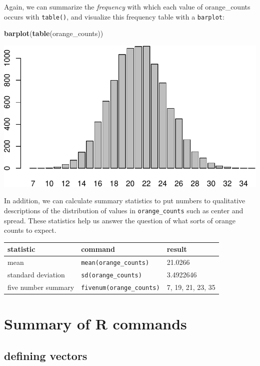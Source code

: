 \documentclass[
]{book}
\newenvironment{Shaded}{\begin{snugshade}}{\end{snugshade}}
\newcommand{\FunctionTok}[1]{\textcolor[rgb]{0.13,0.29,0.53}{\textbf{#1}}}
\newcommand{\NormalTok}[1]{#1}
\theoremstyle{definition}
\theoremstyle{definition}
\theoremstyle{definition}
\theoremstyle{definition}
\theoremstyle{remark}
\begin{document}
Again, we can summarize the \emph{frequency} with which each value of orange\_counts occurs with \texttt{table()}, and visualize this frequency table with a \texttt{barplot}:

\begin{Shaded}
\begin{Highlighting}[]
\FunctionTok{barplot}\NormalTok{(}\FunctionTok{table}\NormalTok{(orange\_counts))}
\end{Highlighting}
\end{Shaded}

\includegraphics{math340-notes_files/figure-latex/unnamed-chunk-91-1.pdf}

In addition, we can calculate summary statistics to put numbers to qualitative descriptions of the distribution of values in \texttt{orange\_counts} such as center and spread. These statistics help us answer the question of what sorts of orange counts to expect.

\begin{longtable}[]{@{}lll@{}}
\toprule\noalign{}
statistic & command & result \\
\midrule\noalign{}
\endhead
\bottomrule\noalign{}
\endlastfoot
mean & \texttt{mean(orange\_counts)} & 21.0266 \\
standard deviation & \texttt{sd(orange\_counts)} & 3.4922646 \\
five number summary & \texttt{fivenum(orange\_counts)} & 7, 19, 21, 23, 35 \\
\end{longtable}

\section{Summary of R commands}\label{sampling-commands}

\subsection*{defining vectors}\label{defining-vectors}
\end{document}
